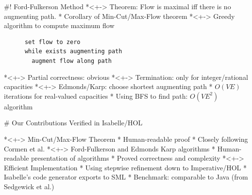 \documentclass[fleqn]{beamer}
\newcommand{\edge}[1]{\stackrel{#1}{\longrightarrow}}
\begin{document}
%   
% 

#! Ford-Fulkerson Method
  *<+-> Theorem: Flow is maximal iff there is no augmenting path.
    * Corollary of Min-Cut/Max-Flow theorem
  *<+-> Greedy algorithm to compute maximum flow
    \begin{lstlisting}
      set flow to zero
      while exists augmenting path
        augment flow along path
    \end{lstlisting}%
  *<+-> Partial correctness: obvious
  *<+-> Termination: only for integer/rational capacities
  *<+-> Edmonds/Karp: choose shortest augmenting path
    * $O(VE)$ iterations for real-valued capacities
    * Using BFS to find path: $O(VE^2)$ algorithm

# Our Contributions 
  {Verified in Isabelle/HOL}

  *<+-> Min-Cut/Max-Flow Theorem
    * Human-readable proof
    * Closely following Cormen et al.
  *<+-> Ford-Fulkerson and Edmonds Karp algorithms
    * Human-readable presentation of algorithms
    * Proved correctness and complexity
  *<+-> Efficient Implementation
    * Using stepwise refinement down to Imperative/HOL
    * Isabelle's code generator exports to SML
    * Benchmark: comparable to Java (from Sedgewick et al.)

\newcommand{\augment}{{\mathbin\uparrow}}%

\def\isasnipcolor{black}

\newcommand{\isawithcolor}[2]{{\setbeamercolor{math text}{fg=#1}\textcolor{#1}{#2}}}
\end{document}
